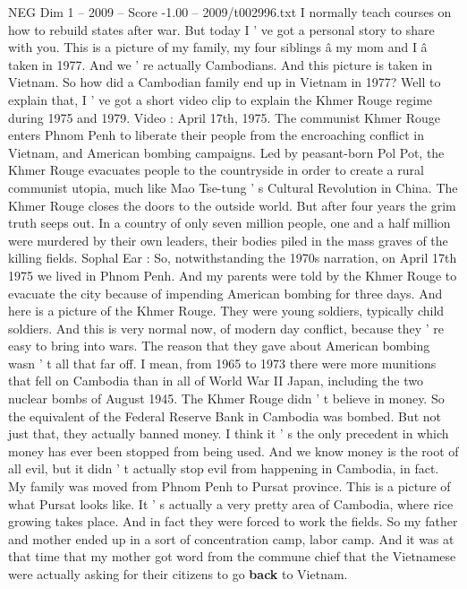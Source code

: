 \begin{textsample}{NEG Dim 1 – 2009 – Score -1.00 – 2009/t002996.txt}  \label{ex:f1_neg_051}
I normally teach courses on how to rebuild states after war.
But today I ' ve got a personal story to share with you.
This is a picture of my family, my four siblings â my mom and I â taken in 1977.
And we ' re actually Cambodians.
And this picture is taken in Vietnam.
So how did a Cambodian family end up in Vietnam in 1977?
Well to explain that, I ' ve got a short video clip to explain the Khmer Rouge regime during 1975 and 1979.
Video : April 17th, 1975.
The communist Khmer Rouge enters Phnom Penh to liberate their people from the encroaching conflict in Vietnam, and American bombing campaigns.
Led by peasant-born Pol Pot, the Khmer Rouge evacuates people to the countryside in order to create a rural communist utopia, much like Mao Tse-tung ' s Cultural Revolution in China.
The Khmer Rouge closes the doors to the outside world.
But after four years the grim truth seeps out.
In a country of only seven million people, one and a half million were murdered by their own leaders, their bodies piled in the mass graves of the killing fields.
Sophal Ear : So, notwithstanding the 1970s narration, on April 17th 1975 we lived in Phnom Penh.
And my parents were told by the Khmer Rouge to evacuate the city because of impending American bombing for three days.
And here is a picture of the Khmer Rouge.
They were young soldiers, typically child soldiers.
And this is very normal now, of modern day conflict, because they ' re easy to bring into wars.
The reason that they gave about American bombing wasn ' t all that far off.
I mean, from 1965 to 1973 there were more munitions that fell on Cambodia than in all of World War II Japan, including the two nuclear bombs of August 1945.
The Khmer Rouge didn ' t believe in money.
So the equivalent of the Federal Reserve Bank in Cambodia was bombed.
But not just that, they actually banned money.
I think it ' s the only precedent in which money has ever been stopped from being used.
And we know money is the root of all evil, but it didn ' t actually stop evil from happening in Cambodia, in fact.
My family was moved from Phnom Penh to Pursat province.
This is a picture of what Pursat looks like.
It ' s actually a very pretty area of Cambodia, where rice growing takes place.
And in fact they were forced to work the fields.
So my father and mother ended up in a sort of concentration camp, labor camp.
And it was at that time that my mother got word from the commune chief that the Vietnamese were actually asking for their citizens to go \textbf{back} to Vietnam.

\end{textsample}

